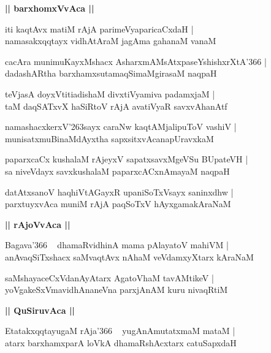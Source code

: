 \documentclass[twoside,12pt,openright]{book}
\def\S{\char'263}
\newcounter{shloka}[chapter]
\def\uvaca#1{\centerline{{\large\textbf{#1}}}}
\begin{document}
\uvaca{|| barxhomxVvAca ||}

\begin{shloka}%
iti kaqtAvx matiM rAjA parimeVyaparicaCxdaH |\\
namasakxqqtayx vidhAtAraM jagAma gahanaM vanaM 
\end{shloka}

\begin{shloka}%
cacAra munimuKayxMshacx AsharxmAMsAtxpaseYshishxrXtA\char'366 |\\
dadashARtha barxhamxsutamaqSimaMgirasaM naqpaH 
\end{shloka}

\begin{shloka}%
teVjasA doyxVtitiadishaM divxtiVyamiva padamxjaM |\\
taM daqSATxvX haSiRtoV rAjA avatiVyaR savxvAhanAtf
\end{shloka}

\begin{shloka}%
namashacxkerxV\S sayx caraNw kaqtAMjalipuToV vashiV |\\
munisatxmuBinaMdAyxtha sapxsitxvAcanapUravxkaM 
\end{shloka}

\begin{shloka}%
paparxcaCx kushalaM rAjeyxV sapatxsavxMgeVSu BUpateVH |\\
sa niveVdayx savxkushalaM paparxcACxnAmayaM naqpaH 
\end{shloka}

\begin{shloka}%
datAtxsanoV haqhiVtAGayxR upaniSoTxVsayx saninxdhw |\\
parxtuyxvAca muniM rAjA paqSoTxV hAyxgamakAraNaM
\end{shloka}

\uvaca{|| rAjoVvAca ||}

\begin{shloka}%
Bagava\char'366 ~ dhamaRvidhinA mama pAlayatoV mahiVM |\\
anAvaqSiTxshacx saMvaqtAvx nAhaM veVdamxyXtarx kAraNaM 
\end{shloka}

\begin{shloka}%
saMshayaceCxVdanAyAtarx AgatoVhaM tavAMtikeV |\\
yoVgakeSxVmavidhAnaneVna parxjAnAM kuru nivaqRtiM
\end{shloka}

\uvaca{|| QuSiruvAca ||}

\begin{shloka}%
EtatakxqqtayugaM rAja\char'366 ~ yugAnAmutatxmaM mataM |\\
atarx barxhamxparA loVkA dhamaRshAcxtarx catuSapxdaH 
\end{shloka}
\end{document}
